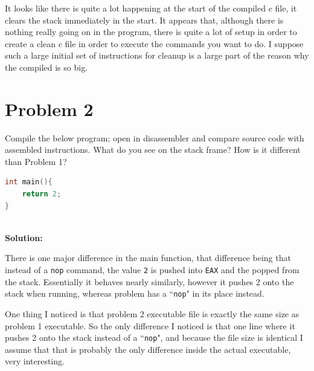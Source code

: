 \documentclass[12pt]{article}
\newcommand\tab[1][0.5cm]{\hspace*{#1}}
\begin{document}
It looks like there is quite a lot happening at the start of the compiled c file, it clears the stack immediately in the start. It appears 
that, although there is nothing really going on in the program, there is quite a lot of setup in order to create a clean c file in order to
execute the commands you want to do. I suppose such a large initial set of instructions for cleanup is a large part of the reason why the 
compiled is so big. 


\newpage

\section{Problem 2}
\tab Compile the below program; open in disassembler and compare source code with assembled
instructions. What do you see on the stack frame? How is it different than Problem 1?
\begin{lstlisting}[language=C]
int main(){
	return 2;
}
\end{lstlisting}
\textbf{\\Solution:\\}

There is one major difference in the main function, that difference being that instead of a \texttt{nop} command, the value \texttt{2} is
pushed into \texttt{EAX} and the popped from the stack. Essentially it behaves nearly similarly, however it pushes 2 onto the stack when running, whereas problem has a ``\texttt{nop}" in its place instead. 

One thing I noticed is that problem 2 executable file is exactly the same size as problem 1 executable. So the only difference I noticed is
that one line where it pushes 2 onto the stack instead of a ``\texttt{nop}", and because the file size is identical I assume that that is
probably the only difference inside the actual executable, very interesting.  


\newpage
\end{document}
